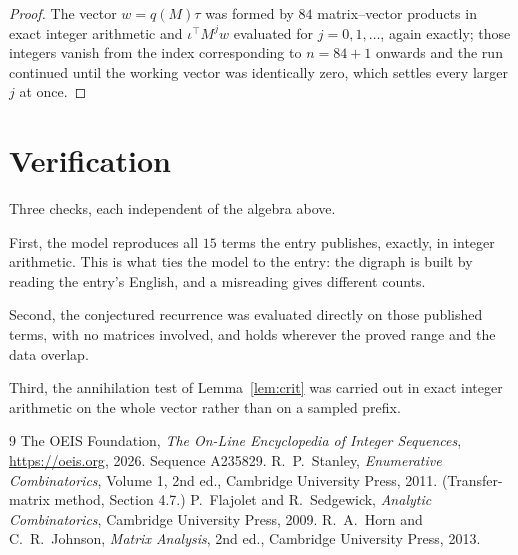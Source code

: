 \documentclass[11pt,a4paper]{article}
\theoremstyle{plain}
\theoremstyle{definition}
\begin{document}
\begin{proof}
The vector $w=q(M)\tau$ was formed by $84$ matrix--vector products in exact integer
arithmetic and $\iota^{\!\top}M^{j}w$ evaluated for $j=0,1,\dots$, again exactly; those
integers vanish from the index corresponding to $n=84+1$ onwards and the run continued
until the working vector was identically zero, which settles every larger $j$ at once.
\end{proof}

\section{Verification}

Three checks, each independent of the algebra above.

First, the model reproduces all $15$ terms the entry publishes, exactly, in integer
arithmetic. This is what ties the model to the entry: the digraph is built by reading the
entry's English, and a misreading gives different counts.

Second, the conjectured recurrence was evaluated directly on those published terms, with no
matrices involved, and holds wherever the proved range and the data overlap.

Third, the annihilation test of Lemma~\ref{lem:crit} was carried out in exact integer
arithmetic on the whole vector rather than on a sampled prefix.

\begin{thebibliography}{9}
 The OEIS Foundation, \emph{The On-Line Encyclopedia of Integer
Sequences}, \url{https://oeis.org}, 2026. Sequence A235829.
 R.~P.~Stanley, \emph{Enumerative Combinatorics}, Volume 1, 2nd ed.,
Cambridge University Press, 2011. (Transfer-matrix method, Section 4.7.)
 P.~Flajolet and R.~Sedgewick, \emph{Analytic Combinatorics}, Cambridge
University Press, 2009.
 R.~A.~Horn and C.~R.~Johnson, \emph{Matrix Analysis}, 2nd ed., Cambridge
University Press, 2013.
\end{thebibliography}
\end{document}
